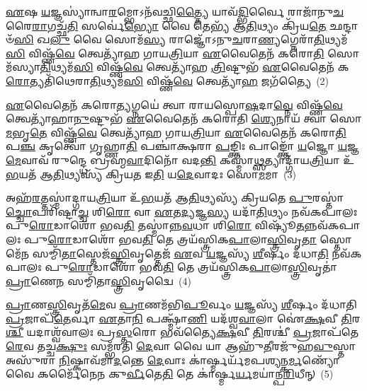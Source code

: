 \-\ul{𑌏}\-𑌷 \ul{𑌯}\-𑌜𑍍𑌞𑌸𑍍𑌯𑌾॑𑌨𑍍𑌵𑌾\-\ul{𑌰}\-𑌮𑍍𑌭𑍋\-𑌽𑌨᳴𑌵𑌚𑍍𑌛𑌿\-\ul{𑌤𑍍𑌤𑍍𑌯𑍈} 𑌯𑌾𑌵᳴\-\ul{𑌦𑍍𑌭𑌿}\-𑌰𑍍𑌵𑍈 𑌰𑌾𑌜𑌾᳴𑌨𑍁\-\ul{𑌚}\-𑌰𑍈\-\ul{𑌰𑌾}\-𑌗𑌚𑍍𑌛᳴\-\ul{𑌤𑌿} 𑌸𑌰𑍍𑌵𑍇॑\-\ul{𑌭𑍍𑌯𑍋} 𑌵𑍈 𑌤𑍇𑌭𑍍𑌯᳴ 𑌆\-\ul{𑌤𑌿}\-𑌥𑍍𑌯𑌂 𑌕𑍍𑌰𑌿᳴𑌯\-\ul{𑌤𑍇} 𑌛𑌨𑍍𑌦𑌾𑍞᳴\-\ul{𑌸𑌿} 𑌖\-\ul{𑌲𑍁} 𑌵𑍈 𑌸𑍋𑌮᳴\-\ul{𑌸𑍍𑌯} 𑌰𑌾𑌜𑍍𑌞𑍋᳴\-𑌽𑌨𑍁\-\ul{𑌚}\-𑌰𑌾\-\ul{𑌣𑍍𑌯}\-𑌗𑍍𑌨𑍇𑌰𑌾᳴\-\ul{𑌤𑌿}\-𑌥𑍍𑌯𑌮᳴\-\ul{𑌸𑌿} 𑌵𑌿𑌷𑍍𑌣᳴\-\ul{𑌵𑍇} 𑌤𑍍𑌵𑍇𑌤𑍍𑌯𑌾᳴𑌹 𑌗𑌾𑌯\-\ul{𑌤𑍍𑌰𑌿}\-𑌯𑌾 \ul{𑌏}\-𑌵𑍈𑌤𑍇𑌨᳴ 𑌕𑌰𑍋\-\ul{𑌤𑌿} 𑌸𑍋𑌮᳴𑌸𑍍𑌯𑌾\-\ul{𑌤𑌿}\-𑌥𑍍𑌯𑌮᳴\-\ul{𑌸𑌿} 𑌵𑌿𑌷𑍍𑌣᳴\-\ul{𑌵𑍇} 𑌤𑍍𑌵𑍇𑌤𑍍𑌯𑌾᳴𑌹 \ul{𑌤𑍍𑌰𑌿}\-𑌷𑍍𑌟𑍁𑌭᳴ \ul{𑌏}\-𑌵𑍈𑌤𑍇𑌨᳴ 𑌕\-\ul{𑌰𑍋}\-𑌤𑍍𑌯𑌤𑌿᳴𑌥𑍇𑌰𑌾\-\ul{𑌤𑌿}\-𑌥𑍍𑌯𑌮᳴\-\ul{𑌸𑌿} 𑌵𑌿𑌷𑍍𑌣᳴\-\ul{𑌵𑍇} 𑌤𑍍𑌵𑍇𑌤𑍍𑌯𑌾᳴\-\ul{𑌹} 𑌜𑌗᳴𑌤𑍍𑌯𑍈~(2)

\-\ul{𑌏}\-𑌵𑍈𑌤𑍇𑌨᳴ 𑌕𑌰𑍋\-\ul{𑌤𑍍𑌯}\-𑌗𑍍𑌨𑌯𑍇॑ 𑌤𑍍𑌵𑌾 𑌰𑌾𑌯𑌸𑍍𑌪𑍋\-\ul{𑌷}\-𑌦𑌾\-\ul{𑌵𑍍𑌨𑍇} 𑌵𑌿𑌷𑍍𑌣᳴\-\ul{𑌵𑍇} 𑌤𑍍𑌵𑍇𑌤𑍍𑌯𑌾᳴𑌹𑌾\-\ul{𑌨𑍁}\-𑌷𑍍𑌟𑍁𑌭᳴ \ul{𑌏}\-𑌵𑍈𑌤𑍇𑌨᳴ 𑌕𑌰𑍋𑌤𑌿 \ul{𑌶𑍍𑌯𑍇}\-𑌨𑌾𑌯᳴ 𑌤𑍍𑌵𑌾 𑌸𑍋\-\ul{𑌮}\-𑌭𑍃\-\ul{𑌤𑍇} 𑌵𑌿𑌷𑍍𑌣᳴\-\ul{𑌵𑍇} 𑌤𑍍𑌵𑍇𑌤𑍍𑌯𑌾᳴𑌹 𑌗𑌾𑌯\-\ul{𑌤𑍍𑌰𑌿}\-𑌯𑌾 \ul{𑌏}\-𑌵𑍈𑌤𑍇𑌨᳴ 𑌕𑌰𑍋\-\ul{𑌤𑌿} 𑌪\-\ul{𑌞𑍍𑌚} 𑌕𑍃𑌤𑍍𑌵𑍋᳴ 𑌗𑍃𑌹𑍍𑌣𑌾\-\ul{𑌤𑌿} 𑌪𑌞𑍍𑌚𑌾॑𑌕𑍍𑌷𑌰𑌾 \ul{𑌪}\-𑌙𑍍𑌕𑍍𑌤𑌿𑌃 𑌪𑌾𑌙𑍍𑌕𑍍𑌤𑍋᳴ \ul{𑌯}\-𑌜𑍍𑌞𑍋 \ul{𑌯}\-𑌜𑍍𑌞\-\ul{𑌮𑍇}\-𑌵𑌾𑌵᳴ 𑌰𑍁𑌨𑍍𑌦𑍍𑌧𑍇 𑌬𑍍𑌰𑌹𑍍𑌮\-\ul{𑌵𑌾}\-𑌦𑌿𑌨𑍋᳴ 𑌵𑌦\-\ul{𑌨𑍍𑌤𑌿} 𑌕𑌸𑍍𑌮𑌾॑\-\ul{𑌥𑍍𑌸}\-𑌤𑍍𑌯𑌾𑌦𑍍𑌗𑌾᳴𑌯\-\ul{𑌤𑍍𑌰𑌿}\-𑌯𑌾 𑌉᳴\-\ul{𑌭}\-𑌯𑌤᳴ 𑌆\-\ul{𑌤𑌿}\-𑌥𑍍𑌯𑌸𑍍𑌯᳴ 𑌕𑍍𑌰𑌿𑌯\-\ul{𑌤} 𑌇\-\ul{𑌤𑌿} 𑌯\-\ul{𑌦𑍇}\-𑌵𑌾𑌦𑌃 𑌸𑍋\-\ul{𑌮}\-𑌮𑌾~(3)

𑌅𑌹᳴\-\ul{𑌰}\-𑌤𑍍𑌤𑌸𑍍𑌮𑌾॑𑌦𑍍𑌗𑌾𑌯\-\ul{𑌤𑍍𑌰𑌿}\-𑌯𑌾 𑌉᳴\-\ul{𑌭}\-𑌯𑌤᳴ 𑌆\-\ul{𑌤𑌿}\-𑌥𑍍𑌯𑌸𑍍𑌯᳴ 𑌕𑍍𑌰𑌿𑌯𑌤𑍇 \ul{𑌪𑍁}\-𑌰𑌸𑍍𑌤𑌾॑\-\ul{𑌚𑍍𑌚𑍋}\-𑌪𑌰𑌿᳴𑌷𑍍𑌟𑌾\-\ul{𑌚𑍍𑌚} 𑌶𑌿\-\ul{𑌰𑍋} 𑌵𑌾 \ul{𑌏}\-𑌤\-\ul{𑌦𑍍𑌯}\-𑌜𑍍𑌞\-\ul{𑌸𑍍𑌯} 𑌯𑌦𑌾᳴\-\ul{𑌤𑌿}\-𑌥𑍍𑌯𑌂 𑌨𑌵᳴𑌕𑌪𑌾𑌲𑌃 𑌪𑍁\-\ul{𑌰𑍋}\-𑌡𑌾𑌶𑍋᳴ 𑌭𑌵\-\ul{𑌤𑌿} 𑌤𑌸𑍍𑌮𑌾॑𑌨𑍍𑌨\-\ul{𑌵}\-𑌧𑌾 𑌶𑌿\-\ul{𑌰𑍋} 𑌵𑌿𑌷𑍍𑌯𑍂᳴\-\ul{𑌤}\-𑌨𑍍𑌨𑌵᳴𑌕𑌪𑌾𑌲𑌃 𑌪𑍁\-\ul{𑌰𑍋}\-𑌡𑌾𑌶𑍋᳴ 𑌭𑌵\-\ul{𑌤𑌿} 𑌤𑍇 𑌤𑍍𑌰𑌯᳴𑌸𑍍𑌤𑍍𑌰𑌿𑌕\-\ul{𑌪𑌾}\-𑌲𑌾\-\ul{𑌸𑍍𑌤𑍍𑌰𑌿}\-𑌵𑍃\-\ul{𑌤𑌾} 𑌸𑍍𑌤𑍋𑌮𑍇᳴\-\ul{𑌨} 𑌸𑌮𑍍𑌮𑌿᳴\-\ul{𑌤𑌾}\-𑌸𑍍𑌤𑍇𑌜᳴\-\ul{𑌸𑍍𑌤𑍍𑌰𑌿}\-𑌵𑍃𑌤𑍍𑌤𑍇𑌜᳴ \ul{𑌏}\-𑌵 \ul{𑌯}\-𑌜𑍍𑌞𑌸𑍍𑌯᳴ \ul{𑌶𑍀}\-𑌰𑍍\mbox{}𑌷𑌂 𑌦᳴𑌧𑌾\-\ul{𑌤𑌿} 𑌨𑌵᳴𑌕𑌪𑌾𑌲𑌃 𑌪𑍁\-\ul{𑌰𑍋}\-𑌡𑌾𑌶𑍋᳴ 𑌭𑌵\-\ul{𑌤𑌿} 𑌤𑍇 𑌤𑍍𑌰𑌯᳴𑌸𑍍𑌤𑍍𑌰𑌿𑌕\-\ul{𑌪𑌾}\-𑌲𑌾\-\ul{𑌸𑍍𑌤𑍍𑌰𑌿}\-𑌵𑍃𑌤𑌾॑ \ul{𑌪𑍍𑌰𑌾}\-𑌣𑍇\-\ul{𑌨} 𑌸𑌮𑍍𑌮𑌿᳴𑌤𑌾\-\ul{𑌸𑍍𑌤𑍍𑌰𑌿}\-𑌵𑍃𑌦𑍍𑌵𑍈~(4)

\-\ul{𑌪𑍍𑌰𑌾}\-𑌣\-\ul{𑌸𑍍𑌤𑍍𑌰𑌿}\-𑌵𑍃𑌤᳴\-\ul{𑌮𑍇}\-𑌵 \ul{𑌪𑍍𑌰𑌾}\-𑌣𑌮᳴𑌭𑌿\-\ul{𑌪𑍂}\-𑌰𑍍𑌵𑌂 \ul{𑌯}\-𑌜𑍍𑌞𑌸𑍍𑌯᳴ \ul{𑌶𑍀}\-𑌰𑍍\mbox{}𑌷𑌂 𑌦᳴𑌧𑌾𑌤𑌿 \ul{𑌪𑍍𑌰}\-𑌜𑌾𑌪᳴\-\ul{𑌤𑍇}\-𑌰𑍍𑌵𑌾 \ul{𑌏}\-𑌤𑌾\-\ul{𑌨𑌿} 𑌪𑌕𑍍𑌷𑍍𑌮𑌾᳴\-\ul{𑌣𑌿} 𑌯𑌦᳴𑌶𑍍𑌵\-\ul{𑌵𑌾}\-𑌲𑌾 𑌐॑\-\ul{𑌕𑍍𑌷}\-𑌵𑍀 \ul{𑌤𑌿}\-𑌰\-\ul{𑌶𑍍𑌚𑍀} 𑌯𑌦𑌾𑌶𑍍𑌵᳴𑌵𑌾𑌲𑌃 𑌪𑍍𑌰\-\ul{𑌸𑍍𑌤}\-𑌰𑍋 𑌭𑌵᳴𑌤𑍍𑌯𑍈\-\ul{𑌕𑍍𑌷}\-𑌵𑍀 \ul{𑌤𑌿}\-𑌰𑌶𑍍𑌚𑍀॑ \ul{𑌪𑍍𑌰}\-𑌜𑌾𑌪᳴𑌤𑍇\-\ul{𑌰𑍇}\-𑌵 𑌤𑌚𑍍𑌚\-\ul{𑌕𑍍𑌷𑍁𑌃} 𑌸𑌮𑍍𑌭᳴𑌰𑌤𑌿 \ul{𑌦𑍇}\-𑌵𑌾 𑌵𑍈 𑌯𑌾 𑌆𑌹𑍁᳴\-\ul{𑌤𑍀}\-𑌰𑌜𑍁᳴𑌹\-\ul{𑌵𑍁}\-𑌸𑍍𑌤𑌾 𑌅𑌸𑍁᳴𑌰𑌾 \ul{𑌨𑌿}\-𑌷𑍍𑌕𑌾𑌵᳴𑌮𑌾\-\ul{𑌦}\-𑌨𑍍𑌤𑍇 \ul{𑌦𑍇}\-𑌵𑌾𑌃 𑌕𑌾॑𑌰𑍍\mbox{}\-\ul{𑌷𑍍𑌮}\-𑌰𑍍𑌯᳴𑌮𑌪𑌶𑍍𑌯𑌨𑍍𑌕\-\ul{𑌰𑍍𑌮}\-𑌣𑍍𑌯𑍋᳴ 𑌵𑍈 𑌕𑌰𑍍𑌮𑍈᳴𑌨𑍇𑌨 𑌕𑍁\-\ul{𑌰𑍍𑌵𑍀}\-𑌤𑍇\-\ul{𑌤𑌿} 𑌤𑍇 𑌕𑌾॑𑌰𑍍𑌷𑍍𑌮\-\ul{𑌰𑍍𑌯}\-𑌮𑌯𑌾॑𑌨𑍍𑌪\-\ul{𑌰𑌿}\-𑌧𑍀𑌨𑍍~(5)

